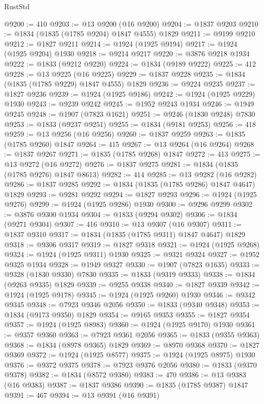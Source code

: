 \begin{lexlean}{RustStd}
\begin{coremodule}
@9200 := 410
@9203 := @13 @9200 (@16 @9200)
@9204 := @1837 @9203
@9210 := @1834 (@1835 (@1785 @9204) @1847 @4555) @1829
@9211 := @9199 @9210
@9212 := @1827 @9211
@9214 := @1924 (@1925 @9194)
@9217 := @1924 (@1925 @9204) @1930
@9218 := @9214 @9217
@9220 := @3876 @9218 @1934
@9222 := @1833 (@9212 @9220)
@9224 := @1834 (@9189 @9222)
@9225 := 412
@9228 := @13 @9225 (@16 @9225)
@9229 := @1837 @9228
@9235 := @1834 (@1835 (@1785 @9229) @1847 @4555) @1829
@9236 := @9224 @9235
@9237 := @1827 @9236
@9239 := @1924 (@1925 @9186)
@9242 := @1924 (@1925 @9229) @1930
@9243 := @9239 @9242
@9245 := @1952 @9243 @1934
@9246 := @1949 @9245
@9248 := @1907 (@7823 @1621)
@9251 := @9246 (@1830 @9248) @7830
@9253 := @1833 (@9237 @9251)
@9255 := @1834 (@9181 @9253)
@9256 := 418
@9259 := @13 @9256 (@16 @9256)
@9260 := @1837 @9259
@9263 := @1835 (@1785 @9260) @1847
@9264 := 415
@9267 := @13 @9264 (@16 @9264)
@9268 := @1837 @9267
@9271 := @1835 (@1785 @9268) @1847
@9272 := 413
@9275 := @13 @9272 (@16 @9272)
@9276 := @1837 @9275
@9281 := @1834 (@1835 (@1785 @9276) @1847 @8613)
@9282 := 414
@9285 := @13 @9282 (@16 @9282)
@9286 := @1837 @9285
@9292 := @1834 (@1835 (@1785 @9286) @1847 @4647) @1829
@9293 := @9281 @9292
@9294 := @1827 @9293
@9296 := @1924 (@1925 @9276)
@9299 := @1924 (@1925 @9286) @1930
@9300 := @9296 @9299
@9302 := @3876 @9300 @1934
@9304 := @1833 (@9294 @9302)
@9306 := @1834 (@9271 @9304)
@9307 := 416
@9310 := @13 @9307 (@16 @9307)
@9311 := @1837 @9310
@9317 := @1834 (@1835 (@1785 @9311) @1847 @4647) @1829
@9318 := @9306 @9317
@9319 := @1827 @9318
@9321 := @1924 (@1925 @9268)
@9324 := @1924 (@1925 @9311) @1930
@9325 := @9321 @9324
@9327 := @1952 @9325 @1934
@9328 := @1949 @9327
@9330 := @1907 (@7823 @1635)
@9333 := @9328 (@1830 @9330) @7830
@9335 := @1833 (@9319 @9333)
@9338 := @1834 (@9263 @9335) @1829
@9339 := @9255 @9338
@9340 := @1827 @9339
@9342 := @1924 (@1925 @9178)
@9345 := @1924 (@1925 @9260) @1930
@9346 := @9342 @9345
@9348 := @7923 @9346 @2056
@9350 := @1833 (@9340 @9348)
@9353 := @1834 (@9173 @9350) @1829
@9354 := @9165 @9353
@9355 := @1827 @9354
@9357 := @1924 (@1925 @8983)
@9360 := @1924 (@1925 @9170) @1930
@9361 := @9357 @9360
@9363 := @7923 @9361 @2056
@9365 := @1833 (@9355 @9363)
@9368 := @1834 (@8978 @9365) @1829
@9369 := @8970 @9368
@9370 := @1827 @9369
@9372 := @1924 (@1925 @8577)
@9375 := @1924 (@1925 @8975) @1930
@9376 := @9372 @9375
@9378 := @7923 @9376 @2056
@9380 := @1833 (@9370 @9378)
@9382 := @1834 (@8572 @9380)
@9383 := 470
@9386 := @13 @9383 (@16 @9383)
@9387 := @1837 @9386
@9390 := @1835 (@1785 @9387) @1847
@9391 := 467
@9394 := @13 @9391 (@16 @9391)

\end{coremodule}
\end{lexlean}
